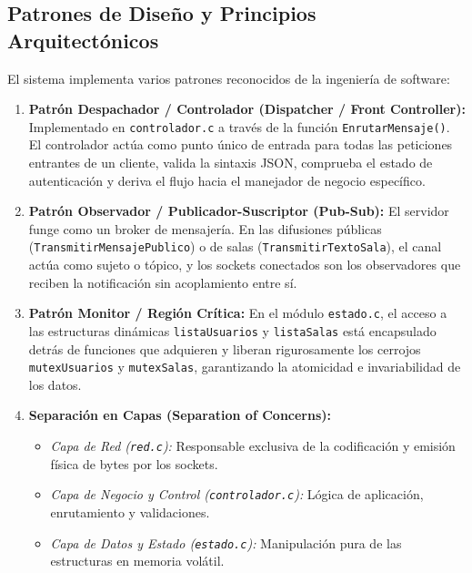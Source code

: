 \documentclass[12pt,a4paper]{article}
\begin{document}
\subsection{Patrones de Diseño y Principios Arquitectónicos}
El sistema implementa varios patrones reconocidos de la ingeniería de software:
\begin{enumerate}
    \item \textbf{Patrón Despachador / Controlador (Dispatcher / Front Controller):} Implementado en \texttt{controlador.c} a través de la función \texttt{EnrutarMensaje()}. El controlador actúa como punto único de entrada para todas las peticiones entrantes de un cliente, valida la sintaxis JSON, comprueba el estado de autenticación y deriva el flujo hacia el manejador de negocio específico.
    \item \textbf{Patrón Observador / Publicador-Suscriptor (Pub-Sub):} El servidor funge como un broker de mensajería. En las difusiones públicas (\texttt{TransmitirMensajePublico}) o de salas (\texttt{TransmitirTextoSala}), el canal actúa como sujeto o tópico, y los sockets conectados son los observadores que reciben la notificación sin acoplamiento entre sí.
    \item \textbf{Patrón Monitor / Región Crítica:} En el módulo \texttt{estado.c}, el acceso a las estructuras dinámicas \texttt{listaUsuarios} y \texttt{listaSalas} está encapsulado detrás de funciones que adquieren y liberan rigurosamente los cerrojos \texttt{mutexUsuarios} y \texttt{mutexSalas}, garantizando la atomicidad e invariabilidad de los datos.
    \item \textbf{Separación en Capas (Separation of Concerns):}
    \begin{itemize}
        \item \textit{Capa de Red (\texttt{red.c}):} Responsable exclusiva de la codificación y emisión física de bytes por los sockets.
        \item \textit{Capa de Negocio y Control (\texttt{controlador.c}):} Lógica de aplicación, enrutamiento y validaciones.
        \item \textit{Capa de Datos y Estado (\texttt{estado.c}):} Manipulación pura de las estructuras en memoria volátil.
    \end{itemize}
\end{enumerate}
\end{document}

